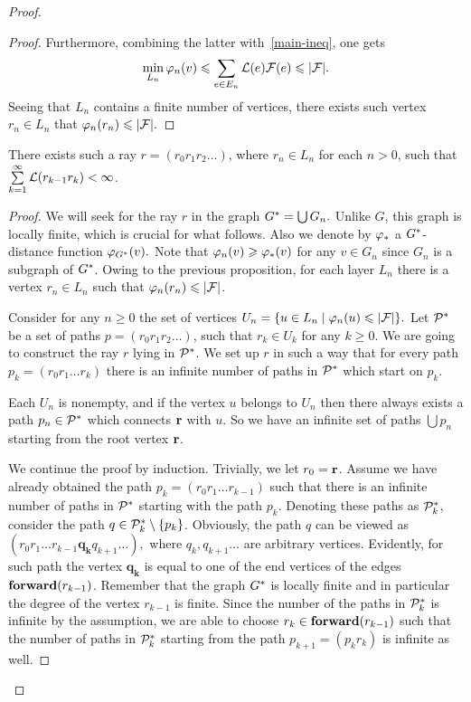 \documentclass[12pt]{amsart}
\begin{document}
\begin{proof}
\begin{proof}
          Furthermore, combining the latter with~\eqref{main-ineq}, one gets
            \[
            \min_{L_n} \phi_n(v) \leq \sum_{e \in E_n} \len(e) \flowpos(e) \leq \lvert\flowpos\rvert.
            \]
          Seeing that $L_n$ contains a finite number of vertices, there exists such vertex $r_n \in L_n$ that
            $\phi_n(r_n) \leq \lvert\flowpos\rvert.$
        \end{proof}
        \begin{prop}
          There exists such a ray $r=(r_0 r_1 r_2\dots)$, where $r_n \in L_n$ for each $n > 0$, such that $\sum\limits_{k=1}^\infty \len(r_{k-1}r_k) < \infty$.
        \end{prop}
        \begin{proof}
          We will seek for the ray $r$ in the graph $\gstar = \bigcup G_n.$ 
          Unlike $G$, this graph is locally finite, which is crucial for what follows.
          Also we denote by $\phistar$ a $\gstar$-distance function $\phi_{\gstar}(v).$
          Note that $\phi_n(v) \geq \phistar(v)$ for any $v \in G_n$ since $G_n$ is a subgraph of $\gstar$.
          Owing to the previous proposition, for each layer $L_n$ there is a vertex $r_n \in L_n$ such that
            $\phi_n(r_n) \leq \lvert\flowpos\rvert$.

          Consider for any $n \geq 0 $ the set of vertices $U_n= \{u \in L_n \mid \phi_n(u) \leq \lvert\flowpos\rvert\}.$
          Let $\cal{P}^*$ be a set of paths $p = (r_0 r_1 r_2 \dots)$, such that $r_k \in U_k$ for any $k \geq 0$.
          We are going to construct the ray $r$ lying in $\cal{P}^*$.
          We set up $r$ in such a way that for every path $p_k= (r_0 r_1 \dots r_k)$ there is an infinite number of paths
            in $\cal{P}^*$ which start on $p_k$.

          Each $U_n$ is nonempty, and if the vertex $u$ belongs to $U_n$ then there always exists
            a path $p_n \in \cal{P}^*$ which connects $\root$ with $u$.
          So we have an infinite set of paths $\bigcup p_n$ starting from the root vertex $\root$.
          
          We continue the proof by induction.
          Trivially, we let $r_0 = \root$.
          Assume we have already obtained the path $p_k= (r_0 r_1\dots r_{k-1})$ such that
            there is an infinite number of paths in $\cal{P}^*$ starting with the path $p_k$.
          Denoting these paths as $\cal{P}^*_k$, consider the path $q \in \cal{P}^*_k \setminus \left\{p_k\right\}$.
          Obviously, the path $q$ can be viewed as $(r_0 r_1 \dots r_{k-1} \mathbf{q_k} q_{k+1} \dots),$
            where $q_k, q_{k+1} \dots$ are arbitrary vertices.
          Evidently, for such path the vertex $\mathbf{q_k}$ is equal to one of the end vertices of the edges $\efor(r_{k-1})$.
          Remember that the graph $\gstar$ is locally finite and in particular the degree of the vertex $r_{k-1}$ is finite.
          Since the number of the paths in $\cal{P}^*_k$ is infinite by the assumption,
            we are able to choose $r_k \in \efor(r_{k-1})$ such that the number of paths in $\cal{P}^*_k$ starting from
            the path $p_{k+1}= (p_k r_k)$ is infinite as well.


\end{proof}
\end{proof}
\end{document}
